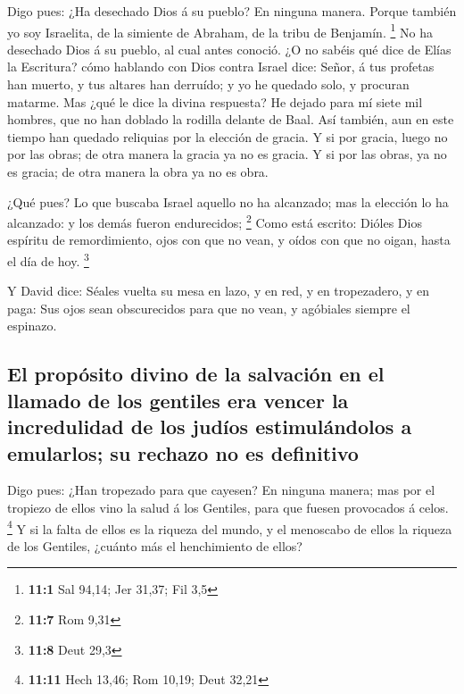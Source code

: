  Digo pues: ¿Ha desechado Dios á su pueblo? En ninguna
manera. Porque también yo soy Israelita, de la simiente de Abraham, de
la tribu de Benjamín. \footnote{\textbf{11:1} Sal 94,14; Jer 31,37; Fil
  3,5}  No ha desechado Dios á su pueblo, al cual antes
conoció. ¿O no sabéis qué dice de Elías la Escritura? cómo hablando con
Dios contra Israel dice:  Señor, á tus profetas han
muerto, y tus altares han derruído; y yo he quedado solo, y procuran
matarme.  Mas ¿qué le dice la divina respuesta? He dejado
para mí siete mil hombres, que no han doblado la rodilla delante de
Baal.  Así también, aun en este tiempo han quedado
reliquias por la elección de gracia.  Y si por gracia,
luego no por las obras; de otra manera la gracia ya no es gracia. Y si
por las obras, ya no es gracia; de otra manera la obra ya no es obra.

 ¿Qué pues? Lo que buscaba Israel aquello no ha alcanzado;
mas la elección lo ha alcanzado: y los demás fueron endurecidos;
\footnote{\textbf{11:7} Rom 9,31}  Como está escrito:
Dióles Dios espíritu de remordimiento, ojos con que no vean, y oídos con
que no oigan, hasta el día de hoy. \footnote{\textbf{11:8} Deut 29,3}

 Y David dice: Séales vuelta su mesa en lazo, y en red, y
en tropezadero, y en paga:  Sus ojos sean obscurecidos
para que no vean, y agóbiales siempre el espinazo.

\hypertarget{el-propuxf3sito-divino-de-la-salvaciuxf3n-en-el-llamado-de-los-gentiles-era-vencer-la-incredulidad-de-los-juduxedos-estimuluxe1ndolos-a-emularlos-su-rechazo-no-es-definitivo}{%
\subsection{El propósito divino de la salvación en el llamado de los
gentiles era vencer la incredulidad de los judíos estimulándolos a
emularlos; su rechazo no es
definitivo}\label{el-propuxf3sito-divino-de-la-salvaciuxf3n-en-el-llamado-de-los-gentiles-era-vencer-la-incredulidad-de-los-juduxedos-estimuluxe1ndolos-a-emularlos-su-rechazo-no-es-definitivo}}

 Digo pues: ¿Han tropezado para que cayesen? En ninguna
manera; mas por el tropiezo de ellos vino la salud á los Gentiles, para
que fuesen provocados á celos. \footnote{\textbf{11:11} Hech 13,46; Rom
  10,19; Deut 32,21}  Y si la falta de ellos es la
riqueza del mundo, y el menoscabo de ellos la riqueza de los Gentiles,
¿cuánto más el henchimiento de ellos?

